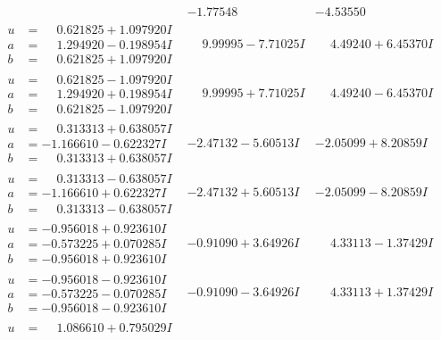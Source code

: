 \documentclass[1p]{elsarticle_modified}
\theoremstyle{definition}
\begin{document}
$$\begin{array}{c|c|c}
 & -1.77548\phantom{ +0.000000I} & -4.53550\phantom{ +0.000000I} \\ \hline\begin{aligned}
u &= \phantom{-}0.621825 + 1.097920 I \\
a &= \phantom{-}1.294920 - 0.198954 I \\
b &= \phantom{-}0.621825 + 1.097920 I\end{aligned}
 & \phantom{-}9.99995 - 7.71025 I & \phantom{-}4.49240 + 6.45370 I \\ \hline\begin{aligned}
u &= \phantom{-}0.621825 - 1.097920 I \\
a &= \phantom{-}1.294920 + 0.198954 I \\
b &= \phantom{-}0.621825 - 1.097920 I\end{aligned}
 & \phantom{-}9.99995 + 7.71025 I & \phantom{-}4.49240 - 6.45370 I \\ \hline\begin{aligned}
u &= \phantom{-}0.313313 + 0.638057 I \\
a &= -1.166610 - 0.622327 I \\
b &= \phantom{-}0.313313 + 0.638057 I\end{aligned}
 & -2.47132 - 5.60513 I & -2.05099 + 8.20859 I \\ \hline\begin{aligned}
u &= \phantom{-}0.313313 - 0.638057 I \\
a &= -1.166610 + 0.622327 I \\
b &= \phantom{-}0.313313 - 0.638057 I\end{aligned}
 & -2.47132 + 5.60513 I & -2.05099 - 8.20859 I \\ \hline\begin{aligned}
u &= -0.956018 + 0.923610 I \\
a &= -0.573225 + 0.070285 I \\
b &= -0.956018 + 0.923610 I\end{aligned}
 & -0.91090 + 3.64926 I & \phantom{-}4.33113 - 1.37429 I \\ \hline\begin{aligned}
u &= -0.956018 - 0.923610 I \\
a &= -0.573225 - 0.070285 I \\
b &= -0.956018 - 0.923610 I\end{aligned}
 & -0.91090 - 3.64926 I & \phantom{-}4.33113 + 1.37429 I \\ \hline\begin{aligned}
u &= \phantom{-}1.086610 + 0.795029 I \\

\end{aligned}
\end{array}$$
\end{document}
